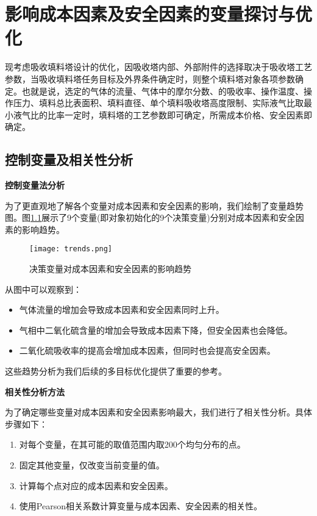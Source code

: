 \chapter{影响成本因素及安全因素的变量探讨与优化}

现考虑吸收填料塔设计的优化，因吸收塔内部、外部附件的选择取决于吸收塔工艺参数，当吸收填料塔任务目标及外界条件确定时，则整个填料塔对象各项参数确定。也就是说，选定的气体的流量、气体中的摩尔分数、的吸收率、操作温度、操作压力、填料总比表面积、填料直径、单个填料吸收塔高度限制、实际液气比取最小液气比的比率一定时，填料塔的工艺参数即可确定，所需成本价格、安全因素即确定。



\section{控制变量及相关性分析}

\textbf{控制变量法分析}

为了更直观地了解各个变量对成本因素和安全因素的影响，我们绘制了变量趋势图。图\ref{fig:trends}展示了9个变量(即对象初始化的9个决策变量)分别对成本因素和安全因素的影响趋势。

\begin{figure}[hbtp]
	\centering
	\texttt{[image: trends.png]}
	\caption{决策变量对成本因素和安全因素的影响趋势}
	\label{fig:trends}
\end{figure}

\clearpage

从图中可以观察到：

\begin{itemize}
	\item 气体流量的增加会导致成本因素和安全因素同时上升。
	\item 气相中二氧化硫含量的增加会导致成本因素下降，但安全因素也会降低。
	\item 二氧化硫吸收率的提高会增加成本因素，但同时也会提高安全因素。
\end{itemize}

这些趋势分析为我们后续的多目标优化提供了重要的参考。

\textbf{相关性分析方法}

为了确定哪些变量对成本因素和安全因素影响最大，我们进行了相关性分析。具体步骤如下：

\begin{enumerate}
	\item 对每个变量，在其可能的取值范围内取200个均匀分布的点。
	\item 固定其他变量，仅改变当前变量的值。
	\item 计算每个点对应的成本因素和安全因素。
	\item 使用Pearson相关系数计算变量与成本因素、安全因素的相关性。
\end{enumerate}

